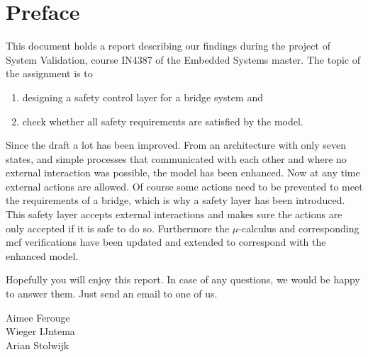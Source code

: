 \newpage
\section*{Preface}

This document holds a report describing our findings during the project of System Validation, course IN4387 of the Embedded Systems master.
The topic of the assignment is to
%
\begin{enumerate}
	\item designing a safety control layer for a bridge system and
	\item check whether all safety requirements are satisfied by the model.
\end{enumerate}
%

Since the draft a lot has been improved. From an architecture with only seven
states, and simple processes that communicated with each other and where no
external interaction was possible, the model has been enhanced. Now at any
time external actions are allowed. Of course some actions need to be prevented
to meet the requirements of a bridge, which is why a safety layer has been
introduced. This safety layer accepts external interactions and makes sure the
actions are only accepted if it is safe to do so. Furthermore the
$\mu$-calculus and corresponding mcf verifications have been updated and
extended to correspond with the enhanced model.

Hopefully you will enjoy this report. In case of any questions, we would be
happy to answer them. Just send an email to one of us.

\vspace{+50pt}
Aimee Ferouge\\
Wieger IJntema\\
Arian Stolwijk

